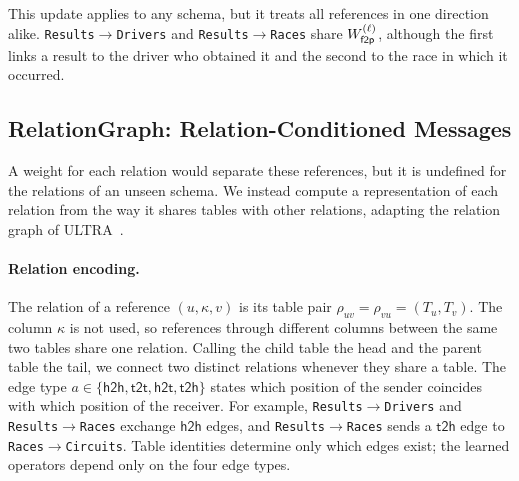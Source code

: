 This update applies to any schema, but it treats all references in one
direction alike. \texttt{Results}$\rightarrow$\texttt{Drivers} and
\texttt{Results}$\rightarrow$\texttt{Races} share $W_{\mathsf{f2p}}^{(\ell)}$, although
the first links a result to the driver who obtained it and the second to the
race in which it occurred.

\subsection{RelationGraph: Relation-Conditioned Messages}
\label{sec:method:relations}

A weight for each relation would separate these references, but it is
undefined for the relations of an unseen schema. We instead compute a
representation of each relation from the way it shares tables with other
relations, adapting the relation graph of ULTRA~\citep{galkin2024ultra}.

\paragraph{Relation encoding.}
The relation of a reference $(u,\kappa,v)$ is its table pair
$\rho_{uv}=\rho_{vu}=(T_u,T_v)$. The column $\kappa$ is not used, so
references through different columns between the same two tables share one
relation. Calling the child table the head and the parent table the tail,
we connect two distinct relations whenever they share a table. The edge type
$a\in\{\mathsf{h2h},\mathsf{t2t},\mathsf{h2t},\mathsf{t2h}\}$ states which
position of the sender coincides with which position of the receiver. For
example, \texttt{Results}$\rightarrow$\texttt{Drivers} and
\texttt{Results}$\rightarrow$\texttt{Races} exchange $\mathsf{h2h}$ edges, and
\texttt{Results}$\rightarrow$\texttt{Races} sends a $\mathsf{t2h}$ edge to
\texttt{Races}$\rightarrow$\texttt{Circuits}. Table identities determine only
which edges exist; the learned operators depend only on the four edge types.

